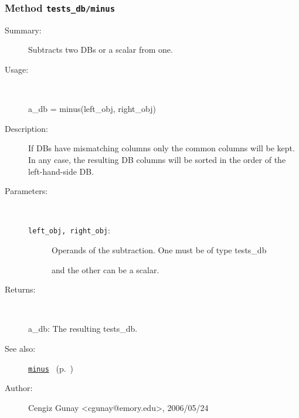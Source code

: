 \subsubsection[Method \texttt{minus}]{Method \texttt{tests\_db/minus}}%
%
\label{ref_tests_db__minus}%
\hypertarget{ref_tests_db__minus}{}%
\begin{description}
\item[Summary:]Subtracts two DBs or a scalar from one.
%
\item[Usage:]~%
\begin{lyxcode}%
a\_db = minus(left\_obj, right\_obj)
%
\end{lyxcode}%
%
\item[Description:]%
If DBs have mismatching columns only the common columns will be kept.
 In any case, the resulting DB columns will be sorted in the order of the
 left-hand-side DB.
\item[Parameters:]~
\begin{description}%
\item[\texttt{left\_obj, right\_obj}:]
 Operands of the subtraction. One must be of type tests\_db

and the other can be a scalar.\end{description}%
%
\item[Returns:]~

	a\_db: The resulting tests\_db.
%
%
\item[See also:]%
\hyperlink{ref_minus}{\texttt{minus}}%
\ (p.~\pageref{ref_minus})%
%
%
\item[Author:]%
Cengiz Gunay <cgunay@emory.edu>, 2006/05/24%
\end{description}
\methodline%
